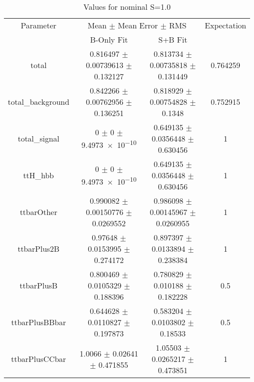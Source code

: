 \begin{table}
\centering
\caption{Values for nominal S=1.0}
\begin{tabular}{cccc}
\toprule
Parameter & \multicolumn{2}{c}{Mean $\pm$ Mean Error $\pm$ RMS} & Expectation\\
 & B-Only Fit & S+B Fit & \\
\midrule
total & \num{0.816497} $\pm$ \num{0.00739613} $\pm$ \num{0.132127} & \num{0.813734} $\pm$ \num{0.00735818} $\pm$ \num{0.131449} & \num{0.764259}\\
total\_background & \num{0.842266} $\pm$ \num{0.00762956} $\pm$ \num{0.136251} & \num{0.818929} $\pm$ \num{0.00754828} $\pm$ \num{0.1348} & \num{0.752915}\\
total\_signal & \num{0} $\pm$ \num{0} $\pm$ \num{9.4973e-10} & \num{0.649135} $\pm$ \num{0.0356448} $\pm$ \num{0.630456} & \num{1}\\
ttH\_hbb & \num{0} $\pm$ \num{0} $\pm$ \num{9.4973e-10} & \num{0.649135} $\pm$ \num{0.0356448} $\pm$ \num{0.630456} & \num{1}\\
ttbarOther & \num{0.990082} $\pm$ \num{0.00150776} $\pm$ \num{0.0269552} & \num{0.986098} $\pm$ \num{0.00145967} $\pm$ \num{0.0260955} & \num{1}\\
ttbarPlus2B & \num{0.97648} $\pm$ \num{0.0153995} $\pm$ \num{0.274172} & \num{0.897397} $\pm$ \num{0.0133894} $\pm$ \num{0.238384} & \num{1}\\
ttbarPlusB & \num{0.800469} $\pm$ \num{0.0105329} $\pm$ \num{0.188396} & \num{0.780829} $\pm$ \num{0.010188} $\pm$ \num{0.182228} & \num{0.5}\\
ttbarPlusBBbar & \num{0.644628} $\pm$ \num{0.0110827} $\pm$ \num{0.197873} & \num{0.583204} $\pm$ \num{0.0103802} $\pm$ \num{0.18533} & \num{0.5}\\
ttbarPlusCCbar & \num{1.0066} $\pm$ \num{0.02641} $\pm$ \num{0.471855} & \num{1.05503} $\pm$ \num{0.0265217} $\pm$ \num{0.473851} & \num{1}\\
\bottomrule
\end{tabular}
\end{table}